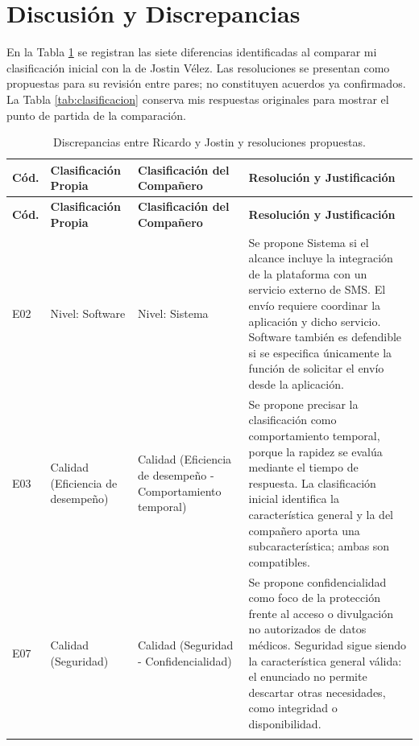 \documentclass[10pt,a4paper]{article}
\begin{document}
\section{Discusión y Discrepancias}

En la Tabla \ref{tab:discrepancias} se registran las siete diferencias identificadas al comparar mi clasificación inicial con la de Jostin Vélez. Las resoluciones se presentan como propuestas para su revisión entre pares; no constituyen acuerdos ya confirmados. La Tabla \ref{tab:clasificacion} conserva mis respuestas originales para mostrar el punto de partida de la comparación.

\small
\begin{longtable}{@{}>{\raggedright\arraybackslash}p{0.8cm}>{\raggedright\arraybackslash}p{3.2cm}>{\raggedright\arraybackslash}p{3.5cm}>{\raggedright\arraybackslash}p{6.3cm}@{}}
	\caption{Discrepancias entre Ricardo y Jostin y resoluciones propuestas.} \label{tab:discrepancias} \\
	\toprule
	\textbf{Cód.} & \textbf{Clasificación Propia} & \textbf{Clasificación del Compañero} & \textbf{Resolución y Justificación} \\
	\midrule
	\endfirsthead
	\toprule
	\textbf{Cód.} & \textbf{Clasificación Propia} & \textbf{Clasificación del Compañero} & \textbf{Resolución y Justificación} \\
	\midrule
	\endhead
	\bottomrule
	\endfoot
	
	E02 & Nivel: Software & Nivel: Sistema & Se propone Sistema si el alcance incluye la integración de la plataforma con un servicio externo de SMS. El envío requiere coordinar la aplicación y dicho servicio. Software también es defendible si se especifica únicamente la función de solicitar el envío desde la aplicación. \\ \addlinespace
	
	E03 & Calidad (Eficiencia de desempeño) & Calidad (Eficiencia de desempeño - Comportamiento temporal) & Se propone precisar la clasificación como comportamiento temporal, porque la rapidez se evalúa mediante el tiempo de respuesta. La clasificación inicial identifica la característica general y la del compañero aporta una subcaracterística; ambas son compatibles. \\ \addlinespace
	
	E07 & Calidad (Seguridad) & Calidad (Seguridad - Confidencialidad) & Se propone confidencialidad como foco de la protección frente al acceso o divulgación no autorizados de datos médicos. Seguridad sigue siendo la característica general válida: el enunciado no permite descartar otras necesidades, como integridad o disponibilidad. \\ \addlinespace
	

\end{longtable}
\end{document}
